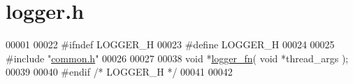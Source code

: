 \hypertarget{logger_8h_source}{}\section{logger.\+h}
\label{logger_8h_source}

\begin{DoxyCode}
00001 
00022 \textcolor{preprocessor}{#ifndef  LOGGER\_H}
00023 \textcolor{preprocessor}{#define  LOGGER\_H}
00024 
00025 \textcolor{preprocessor}{#include "\hyperlink{common_8h}{common.h}"}
00026 
00027 
00038 \textcolor{keywordtype}{void} *\hyperlink{logger_8h_aab6cd4e66af04ba25724dcf4b19d56ef}{logger\_fn}( \textcolor{keywordtype}{void} *thread\_args );
00039 
00040 \textcolor{preprocessor}{#endif   }\textcolor{comment}{/* LOGGER\_H */}\textcolor{preprocessor}{}
00041 
00042 
\end{DoxyCode}
